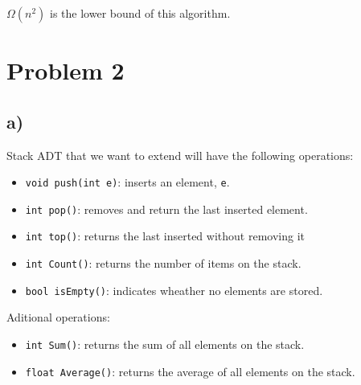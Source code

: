 \documentclass{article}
\begin{document}
	\(\Omega(n^2)\) is the lower bound of this algorithm.


	
	\newpage\section*{Problem 2}

	\subsection*{a)}
	Stack ADT that we want to extend will have the following operations:

	\begin{itemize}
		\item \verb|void push(int e)|: inserts an element, \verb|e|.
		\item \verb|int pop()|: removes and return the last inserted element.
		\item \verb|int top()|: returns the last inserted without removing it
		\item \verb|int Count()|: returns the number of items on the stack.
		\item \verb|bool isEmpty()|: indicates wheather no elements are stored.
	\end{itemize}

	Aditional operations:
	\begin{itemize}
		\item \verb|int Sum()|: returns the sum of all elements on the stack.
		\item \verb|float Average()|: returns the average of all elements on the stack.
	\end{itemize}
\end{document}
